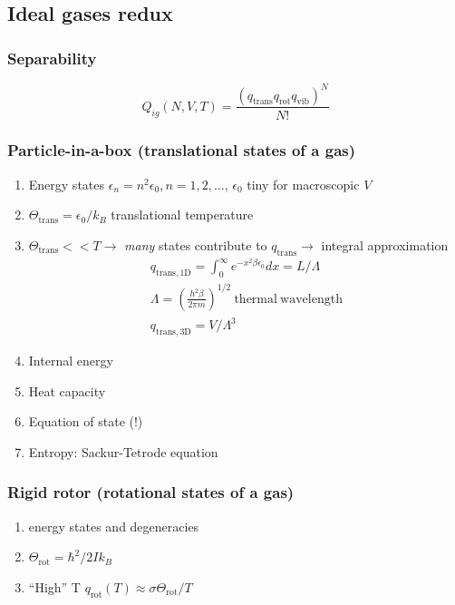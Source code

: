 \documentclass[11pt]{article}
\begin{document}
\subsection{Ideal gases redux}
\label{sec:org0279ab0}
\subsubsection{Separability}
\label{sec:org11570ef}
    \begin{displaymath}
      Q_{ig}(N,V,T) = \frac{(q_\mathrm{trans}q_\mathrm{rot}q_\mathrm{vib})^N}{N!}
\end{displaymath}

\subsubsection{Particle-in-a-box (translational states of a gas)}
\label{sec:org0338541}
\begin{enumerate}
\item Energy states \(\epsilon_n=n^2\epsilon_0, n=1,2, \ldots\),
\(\epsilon_0\) tiny for macroscopic \(V\)
\item \(\Theta_\mathrm{trans} = \epsilon_0/k_B\) translational temperature
\item \(\Theta_\mathrm{trans} << T \rightarrow\) \emph{many} states contribute
to \(q_\mathrm{trans}\rightarrow\) integral approximation
\begin{eqnarray*}
  q_\mathrm{trans,1D} = \int_0^\infty e^{-x^2\beta\epsilon_0}dx =
  L/\Lambda \\
  \Lambda = \left ( \frac{h^2\beta}{2\pi m} \right )^{1/2}\
  \mathrm{thermal\ wavelength} \\
  q_\mathrm{trans,3D} = V/\Lambda^3
\end{eqnarray*}
\item Internal energy
\item Heat capacity
\item Equation of state (!)
\item Entropy: Sackur-Tetrode equation
\end{enumerate}
\subsubsection{Rigid rotor (rotational states of a gas)}
\label{sec:org1de721b}
\begin{enumerate}
\item energy states and degeneracies
\item \(\Theta_\mathrm{rot} = \hbar^2/2 I k_B\)
\item ``High'' T \(q_\mathrm{rot}(T) \approx \sigma \Theta_\mathrm{rot}/T\)
\end{enumerate}
\end{document}
